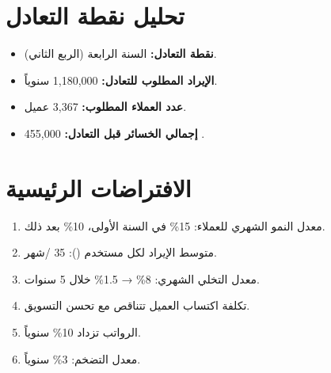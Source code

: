 \documentclass[11pt,a4paper,landscape]{article}
\begin{document}
\section{تحليل نقطة التعادل}
\label{sec:breakeven}

\begin{itemize}
    \item \textbf{نقطة التعادل:} السنة الرابعة (الربع الثاني).
    \item \textbf{الإيراد المطلوب للتعادل:} 1,180,000  سنوياً.
    \item \textbf{عدد العملاء المطلوب:} 3,367 عميل.
    \item \textbf{إجمالي الخسائر قبل التعادل:} 455,000 .
\end{itemize}

\section{الافتراضات الرئيسية}
\label{sec:assumptions}

\begin{enumerate}
    \item معدل النمو الشهري للعملاء: 15\% في السنة الأولى، 10\% بعد ذلك.
    \item متوسط الإيراد لكل مستخدم (): 35 /شهر.
    \item معدل التخلي الشهري: 8\% → 1.5\% خلال 5 سنوات.
    \item تكلفة اكتساب العميل تتناقص مع تحسن التسويق.
    \item الرواتب تزداد 10\% سنوياً.
    \item معدل التضخم: 3\% سنوياً.
\end{enumerate}
\end{document}
